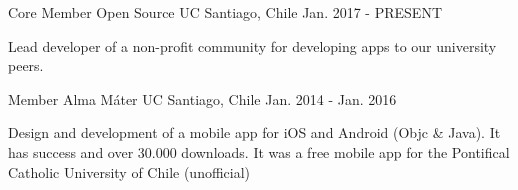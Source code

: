 \begin{cventries}
  \cventry
    {Core Member}
    {Open Source UC}
    {Santiago, Chile}
    {Jan. 2017 - PRESENT}
    {
      \begin{cvitems}
        \item {Lead developer of a non-profit community for developing apps to our university peers.}
      \end{cvitems}
    }
  \cventry
    {Member}
    {Alma Máter UC}
    {Santiago, Chile}
    {Jan. 2014 - Jan. 2016}
    {
      \begin{cvitems}
        \item {Design and development of a mobile app for iOS and Android (Objc \& Java). It has success and over 30.000 downloads. It was a free mobile app for the Pontifical Catholic University of Chile (unofficial)}
      \end{cvitems}
    }
\end{cventries}
